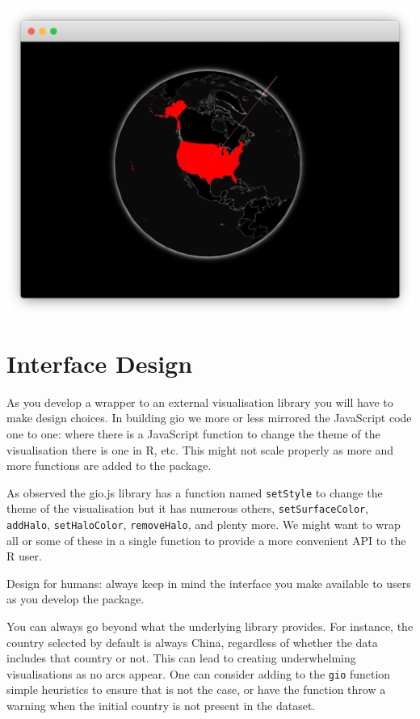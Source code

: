 \documentclass[
]{krantz}
\makeatletter
\newenvironment{kframe}{%
\medskip{}
\setlength{\fboxsep}{.8em}
 \def\at@end@of@kframe{}%
 \ifinner\ifhmode%
  \def\at@end@of@kframe{\end{minipage}}%
  \begin{minipage}{\columnwidth}%
 \fi\fi%
 \def\FrameCommand##1{\hskip\@totalleftmargin \hskip-\fboxsep
 \colorbox{shadecolor}{##1}\hskip-\fboxsep
     \hskip-\linewidth \hskip-\@totalleftmargin \hskip\columnwidth}%
 \MakeFramed {\advance\hsize-\width
   \@totalleftmargin\z@ \linewidth\hsize
   \@setminipage}}%
 {\par\unskip\endMakeFramed%
 \at@end@of@kframe}
\newenvironment{rmdblock}[1]
  {
  \begin{itemize}
  \renewcommand{\labelitemi}{
    \raisebox{-.7\height}[0pt][0pt]{
      {\setkeys{Gin}{width=3em,keepaspectratio}\texttt{[image: images/\#1]}}
    }
  }
  \setlength{\fboxsep}{1em}
  \begin{kframe}
  \item
  }
  {
  \end{kframe}
  \end{itemize}
  }
\newenvironment{rmdnote}
  {\begin{rmdblock}{note}}
  {\end{rmdblock}}
\makeatother
\begin{document}
\includegraphics{images/crosstalk-three-dots.png}

\hypertarget{widgets-final-interface}{%
\section{Interface Design}\label{widgets-final-interface}}

As you develop a wrapper to an external visualisation library you will have to make design choices. In building gio we more or less mirrored the JavaScript code one to one: where there is a JavaScript function to change the theme of the visualisation there is one in R, etc. This might not scale properly as more and more functions are added to the package.

As observed the gio.js library has a function named \texttt{setStyle} to change the theme of the visualisation but it has numerous others, \texttt{setSurfaceColor}, \texttt{addHalo}, \texttt{setHaloColor}, \texttt{removeHalo}, and plenty more. We might want to wrap all or some of these in a single function to provide a more convenient API to the R user.

\begin{rmdnote}
Design for humans: always keep in mind the interface you make available
to users as you develop the package.
\end{rmdnote}

You can always go beyond what the underlying library provides. For instance, the country selected by default is always China, regardless of whether the data includes that country or not. This can lead to creating underwhelming visualisations as no arcs appear. One can consider adding to the \texttt{gio} function simple heuristics to ensure that is not the case, or have the function throw a warning when the initial country is not present in the dataset.
\end{document}
